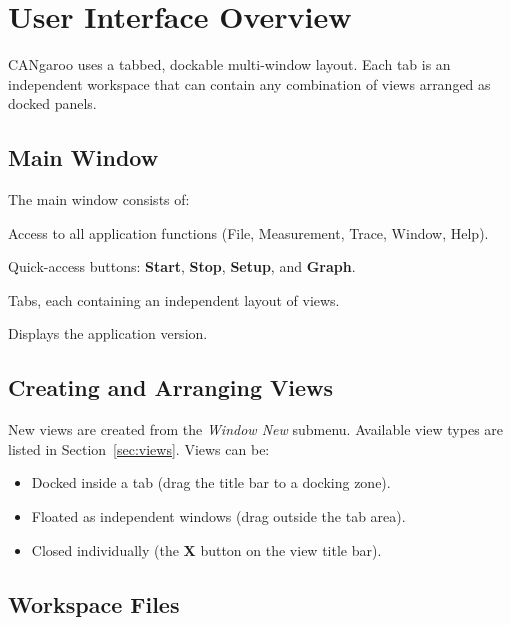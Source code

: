 \documentclass[a4paper,11pt]{article}
\newcommand{\menu}[1]{\textit{#1}}
\newcommand{\ui}[1]{\textbf{#1}}
\begin{document}
\section{User Interface Overview}

CANgaroo uses a tabbed, dockable multi-window layout. Each tab is an independent
workspace that can contain any combination of views arranged as docked panels.

\subsection{Main Window}

The main window consists of:

\begin{description}[leftmargin=2em, style=nextline]
  \item[Menu bar] Access to all application functions (File, Measurement, Trace, Window, Help).
  \item[Toolbar] Quick-access buttons: \ui{Start}, \ui{Stop}, \ui{Setup}, and \ui{Graph}.
  \item[Tab bar] Tabs, each containing an independent layout of views.
  \item[Status bar] Displays the application version.
\end{description}

\subsection{Creating and Arranging Views}

New views are created from the \menu{Window \textrightarrow{} New} submenu.
Available view types are listed in Section~\ref{sec:views}.
Views can be:

\begin{itemize}
  \item Docked inside a tab (drag the title bar to a docking zone).
  \item Floated as independent windows (drag outside the tab area).
  \item Closed individually (the \ui{X} button on the view title bar).
\end{itemize}

\subsection{Workspace Files}
\end{document}
